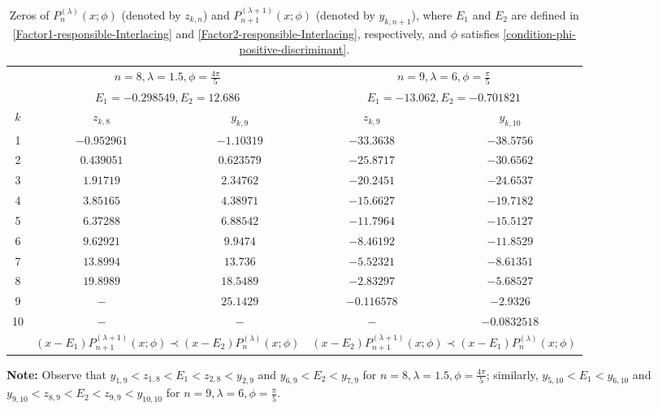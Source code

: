\documentclass[final,3p,times,12pt]{elsarticle}
\numberwithin{equation}{section}  %
\begin{document}
    \begin{table}[H]
		\centering
		\caption{Zeros of $P_{n}^{(\lambda)}(x;\phi)$ (denoted by $z_{k,n}$) and $P_{n+1}^{(\lambda+1)}(x;\phi)$ (denoted by $y_{k,n+1}$), where $E_1$ and $E_2$ are defined in  \eqref{Factor1-responsible-Interlacing} and \eqref{Factor2-responsible-Interlacing}, respectively, and $\phi$ satisfies \eqref{condition-phi-positive-discriminant}. }
		\label{tab3:Interlacingzeros2_MeixnerPoll}
		\footnotesize 
		\setlength{\tabcolsep}{12pt} 
		\begin{tabular}{@{}c cc | cc@{}}
			\toprule
			
			\addlinespace[2pt]
			& \multicolumn{2}{c|}{$n=8, \lambda=1.5, \phi=\frac{4\pi}{5}$} & \multicolumn{2}{c}{$n=9, \lambda=6, \phi=\frac{\pi}{5}$} \\
			& \multicolumn{2}{c|}{$E_1 = -0.298549, E_2=12.686$} & \multicolumn{2}{c}{$E_1=-13.062, E_2=-0.701821$} \\
			\midrule
			$k$ & $z_{k,8}$ & $y_{k,9}$ & $z_{k,9}$ & $y_{k,10}$ \\
			\midrule
			
			1  & $-0.952961$ & $-1.10319$ & $-33.3638$  & $-38.5756$    \\
			2  & $0.439051$  & $0.623579$ & $-25.8717$  & $-30.6562$    \\
			3  & $1.91719$   & $2.34762$  & $-20.2451$  & $-24.6537$    \\
			4  & $3.85165$   & $4.38971$  & $-15.6627$  & $-19.7182$    \\
			5  & $6.37288$   & $6.88542$  & $-11.7964$  & $-15.5127$    \\
			6  & $9.62921$   & $9.9474$   & $-8.46192$  & $-11.8529$    \\
			7  & $13.8994$   & $13.736$   & $-5.52321$  & $-8.61351$    \\
			8  & $19.8989$   & $18.5489$  & $-2.83297$  & $-5.68527$    \\
			9  & $-$         & $25.1429$  & $-0.116578$ & $-2.9326$     \\
			10 & $-$         & $-$        & $-$         & $-0.0832518$\\
			\midrule
			& \multicolumn{2}{c|}{$(x-E_1)P_{n+1}^{(\lambda+1)}(x;\phi)\prec (x-E_2) P_{n}^{(\lambda)}(x;\phi)$} & \multicolumn{2}{c}{$(x-E_2)P_{n+1}^{(\lambda+1)}(x;\phi)\prec (x-E_1) P_{n}^{(\lambda)}(x;\phi)$} \\
			\bottomrule
		\end{tabular}
		
		\vspace{0.2cm}
		\begin{minipage}{0.9\textwidth}
			\footnotesize
			\textbf{Note:}  Observe that $y_{1,9}<z_{1,8}<E_1 < z_{2,8}<y_{2,9}$ and $y_{6,9}<E_2 < y_{7,9}$ for $n=8, \lambda=1.5, \phi=\frac{4\pi}{5}$; similarly, $y_{5,10}<E_1<y_{6,10}$ and $y_{9,10}<z_{8,9}<E_2 < z_{9,9}<y_{10,10}$ for $n=9, \lambda=6, \phi=\frac{\pi}{5}$.
		\end{minipage}
	\end{table}	
    
\end{document}
